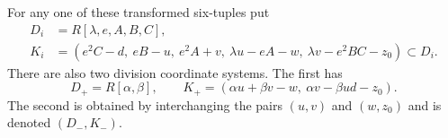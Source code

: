 \documentclass[11pt,reqno]{amsart}
\numberwithin{equation}{section}
\theoremstyle{definition}\newtheorem{definition}[theorem]{Definition}
\theoremstyle{remark}\newtheorem{remark}[theorem]{Remark}
\begin{document}
For any one of these transformed six-tuples put
\begin{equation}\label{eq:all-arc-HB-v166}
\begin{split}
 D_i&=R[\lambda,e,A,B,C],\\
 K_i&=(e^2C-d,\ eB-u,\ e^2A+v,\
                 \lambda u-eA-w,\ \lambda v-e^2BC-z_0)\subset D_i.
\end{split}
\end{equation}
There are also two division coordinate systems. The first has
\begin{equation}\label{eq:all-arc-division-v166}
 D_+=R[\alpha,\beta],\qquad
 K_+=(\alpha u+\beta v-w,\ \alpha v-\beta ud-z_0).
\end{equation}
The second is obtained by interchanging the pairs $(u,v)$ and
$(w,z_0)$ and is denoted $(D_-,K_-)$.
\end{document}
